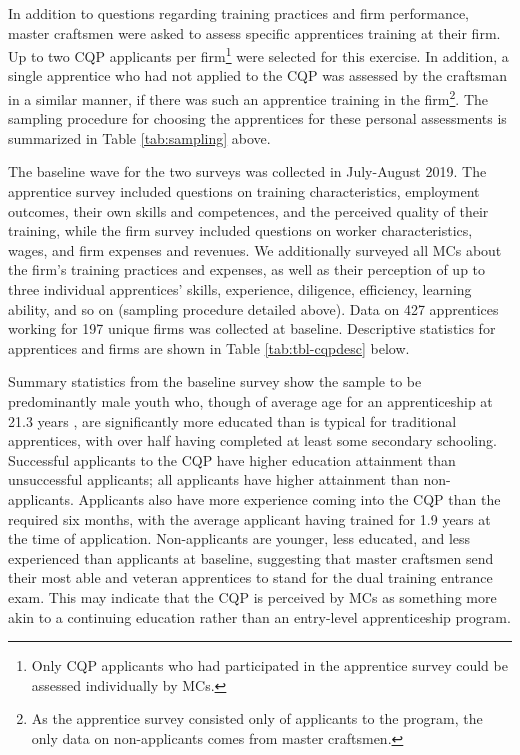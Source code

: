 \documentclass[
  a4paper, twoside, 12pt]{book}
\begin{document}
\onehalfspacing

In addition to questions regarding training practices and firm performance, master craftsmen were asked to assess specific apprentices training at their firm. Up to two CQP applicants per firm\footnote{Only CQP applicants who had participated in the apprentice survey could be assessed individually by MCs.} were selected for this exercise. In addition, a single apprentice who had not applied to the CQP was assessed by the craftsman in a similar manner, if there was such an apprentice training in the firm\footnote{As the apprentice survey consisted only of applicants to the program, the only data on non-applicants comes from master craftsmen.}. The sampling procedure for choosing the apprentices for these personal assessments is summarized in Table \ref{tab:sampling} above.

The baseline wave for the two surveys was collected in July-August 2019. The apprentice survey included questions on training characteristics, employment outcomes, their own skills and competences, and the perceived quality of their training, while the firm survey included questions on worker characteristics, wages, and firm expenses and revenues. We additionally surveyed all MCs about the firm's training practices and expenses, as well as their perception of up to three individual apprentices' skills, experience, diligence, efficiency, learning ability, and so on (sampling procedure detailed above). Data on 427 apprentices working for 197 unique firms was collected at baseline. Descriptive statistics for apprentices and firms are shown in Table \ref{tab:tbl-cqpdesc} below.

\begin{singlespacing}

\end{singlespacing}

Summary statistics from the baseline survey show the sample to be predominantly male youth who, though of average age for an apprenticeship at 21.3 years \autocite{ilo2022}, are significantly more educated than is typical for traditional apprentices, with over half having completed at least some secondary schooling. Successful applicants to the CQP have higher education attainment than unsuccessful applicants; all applicants have higher attainment than non-applicants. Applicants also have more experience coming into the CQP than the required six months, with the average applicant having trained for 1.9 years at the time of application. Non-applicants are younger, less educated, and less experienced than applicants at baseline, suggesting that master craftsmen send their most able and veteran apprentices to stand for the dual training entrance exam. This may indicate that the CQP is perceived by MCs as something more akin to a continuing education rather than an entry-level apprenticeship program.
\end{document}
